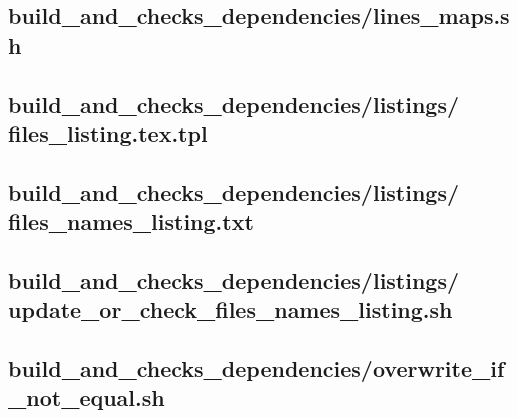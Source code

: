 \documentclass{article}
\begin{document}


\subsection{
  build\_and\_checks\_dependencies/lines\_maps.sh
}
\label{
  build_and_checks_dependencies:lines_mapssh
}



\subsection{
  build\_and\_checks\_dependencies/listings/%
files\_listing.tex.tpl
}
\label{
  build_and_checks_dependencies:listings:files_listingtextpl
}



\subsection{
  build\_and\_checks\_dependencies/listings/%
files\_names\_listing.txt
}
\label{
  build_and_checks_dependencies:listings:files_names_listingtxt
}



\subsection{
  build\_and\_checks\_dependencies/listings/%
update\_or\_check\_files\_names\_listing.sh
}
\label{
  build_and_checks_dependencies:listings:%
update_or_check_files_names_listingsh
}



\subsection{
  build\_and\_checks\_dependencies/overwrite\_if\_not\_equal.sh
}
\label{
  build_and_checks_dependencies:overwrite_if_not_equalsh
}

\end{document}
